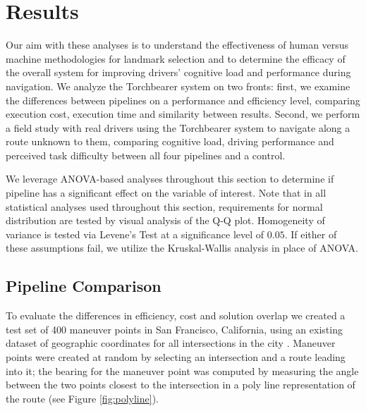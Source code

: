 \chapter{Results}\label{CH:results}

Our aim with these analyses is to understand the effectiveness of human versus machine methodologies for landmark selection and to determine the efficacy of the overall system for improving drivers' cognitive load and performance during navigation. We analyze the Torchbearer system on two fronts: first, we examine the differences between pipelines on a performance and efficiency level, comparing execution cost, execution time and similarity between results. Second, we perform a field study with real drivers using the Torchbearer system to navigate along a route unknown to them, comparing cognitive load, driving performance and perceived task difficulty between all four pipelines and a control.

We leverage ANOVA-based analyses throughout this section to determine if pipeline has a significant effect on the variable of interest. Note that in all statistical analyses used throughout this section, requirements for normal distribution are tested by visual analysis of the Q-Q plot. Homogeneity of variance is tested via Levene's Test at a significance level of $0.05$. If either of these assumptions fail, we utilize the Kruskal-Wallis analysis in place of ANOVA. 

\section{Pipeline Comparison}

To evaluate the differences in efficiency, cost and solution overlap we created a test set of 400 maneuver points in San Francisco, California, using an existing dataset of geographic coordinates for all intersections in the city \cite{sfIntersections}. Maneuver points were created at random by selecting an intersection and a route leading into it; the bearing for the maneuver point was computed by measuring the angle between the two points closest to the intersection in a poly line representation of the route (see Figure \ref{fig:polyline}).


